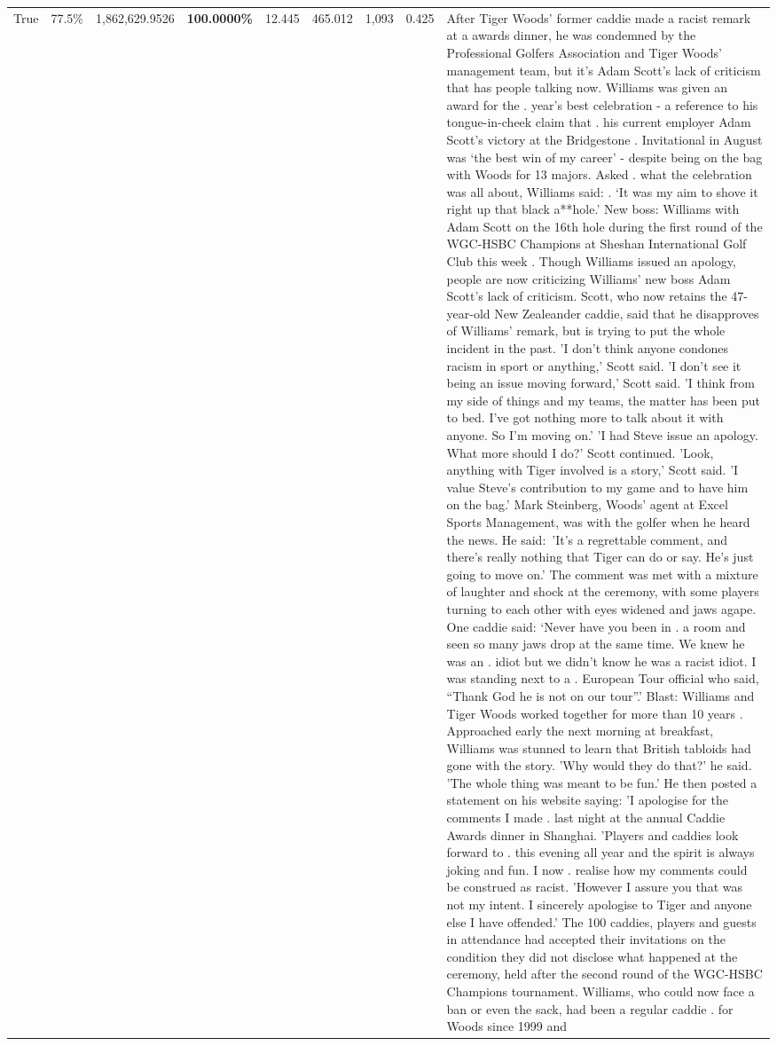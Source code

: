 \begin{table}[H]
\begin{tabular}{lllrlllll}
True & 77.5\% & 1,862,629.9526 & \bfseries \color{red} 100.0000\% & 12.445 & 465.012 & 1,093 & 0.425 & After Tiger Woods' former caddie made a racist remark at a awards dinner, he was condemned by the Professional Golfers Association and Tiger Woods' management team, but it's Adam Scott's lack of criticism that has people talking now. Williams was given an award for the . year’s best celebration - a reference to his tongue-in-cheek claim that . his current employer Adam Scott’s victory at the Bridgestone . Invitational in August was ‘the best win of my career’ - despite being on the bag with Woods for 13 majors. Asked . what the celebration was all about, Williams said: . ‘It was my aim to shove it right up that black a**hole.’ New boss: Williams with Adam Scott  on the 16th hole during the first round of the WGC-HSBC Champions at Sheshan International Golf Club this week . Though Williams issued an apology, people are now criticizing Williams' new boss Adam Scott's lack of criticism. Scott, who now retains the 47-year-old New Zealeander caddie, said that he disapproves of Williams' remark, but is trying to put the whole incident in the past. 'I don't think anyone condones racism in sport or anything,' Scott said. 'I don't see it being an issue moving forward,' Scott said. 'I think from my side of things and my teams, the matter has been put to bed. I've got nothing more to talk about it with anyone. So I'm moving on.' 'I had Steve issue an apology. What more should I do?' Scott continued. 'Look, anything with Tiger involved is a story,' Scott said. 'I value Steve's contribution to my game and to have him on the bag.' Mark Steinberg, Woods' agent at Excel Sports Management, was with the golfer when he heard the news. He said: 'It's a regrettable comment, and there's really nothing that Tiger can do or say. He's just going to move on.' The comment was met with a mixture of laughter and shock at the ceremony, with some players turning to each other with eyes widened and jaws agape. One caddie said: ‘Never have you been in . a room and seen so many jaws drop at the same time. We knew he was an . idiot but we didn’t know he was a racist idiot. I was standing next to a . European Tour official who said, “Thank God he is not on our tour”.’ Blast: Williams and Tiger Woods worked together for more than 10 years . Approached early the next morning at breakfast, Williams was stunned to learn that British tabloids had gone with the story. 'Why would they do that?' he said. 'The whole thing was meant to be fun.' He then posted a statement on his website saying: 'I apologise for the comments I made . last night at the annual Caddie Awards dinner in Shanghai. 'Players and caddies look forward to . this evening all year and the spirit is always joking and fun. I now . realise how my comments could be construed as racist. 'However I assure you that was not my intent. I sincerely apologise to Tiger and anyone else I have offended.' The 100 caddies, players and guests in attendance had accepted their invitations on the condition they did not disclose what happened at the ceremony, held after the second round of the WGC-HSBC Champions tournament. Williams, who could now face a ban or even the sack, had been a regular caddie . for Woods since 1999 and 
\end{tabular}
\end{table}
